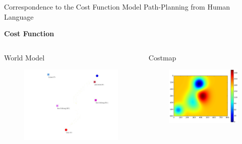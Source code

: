 \begin{frame}{Correspondence to the Cost Function}{ Model Path-Planning from Human Language }

{\bf Cost Function}	
	
\begin{columns}	
\begin{block}{World Model}
\begin{figure}
	\centering
	\includegraphics[width=.9\linewidth]{figure/world_model}
\end{figure}
\end{block}
\begin{block}{Costmap}
\begin{figure}
	\centering
	\includegraphics[width=.9\linewidth]{figure/costmap}
\end{figure}
\end{block}

\end{columns}
\end{frame}
